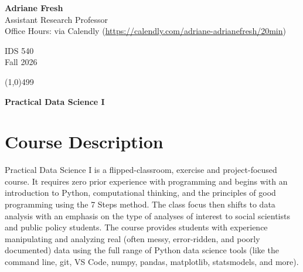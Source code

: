 \documentclass[12pt]{article}
\begin{document}
\singlespacing






\thispagestyle{empty}
\begin{minipage}[t]{.5\textwidth}
	\textbf{Adriane Fresh} \\
	 Assistant Research Professor\\
	 Office Hours: via Calendly (\url{https://calendly.com/adriane-adrianefresh/20min}) \\
     \vspace*{0.1cm}
\end{minipage}
\begin{minipage}[t]{.5\textwidth}
	\begin{flushright}  IDS 540\\
Fall 2026\\
    \vspace*{0.1cm}
\end{flushright}
\end{minipage}


\line(1,0){499}

\vspace{.35in}

\begin{center}
	\textbf{\LARGE{Practical Data Science I} }
\end{center}





\section{Course Description}

Practical Data Science I is a flipped-classroom, exercise and project-focused course. It requires zero prior experience with programming and begins with an introduction to Python, computational thinking, and the principles of good programming using the 7 Steps method. The class focus then shifts to data analysis with an emphasis on the type of analyses of interest to social scientists and public policy students. The course provides students with experience manipulating and analyzing real (often messy, error-ridden, and poorly documented) data using the full range of Python data science tools (like the command line, git, VS Code, numpy, pandas, matplotlib, statsmodels, and more).
\end{document}
